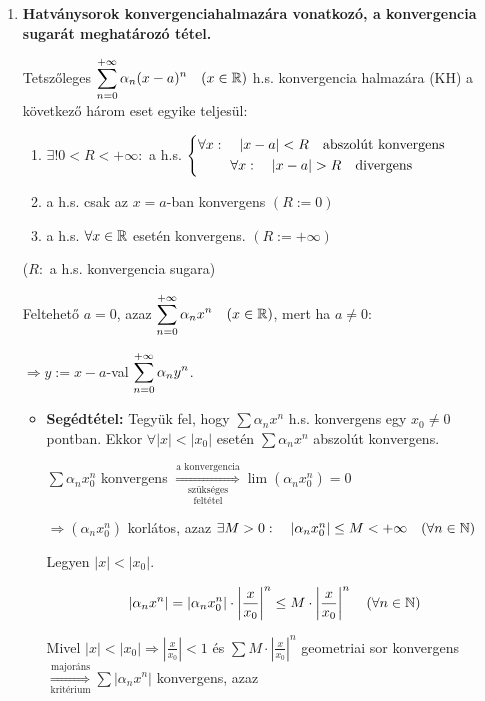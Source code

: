 \documentclass[a4paper,11.5pt]{article}
\begin{document}
\begin{enumerate}
		\item \textbf{Hatványsorok konvergenciahalmazára vonatkozó, a konvergencia sugarát meghatározó tétel.}
		
		Tetszőleges $\displaystyle\sum_{n=0}^{+\infty} \alpha_n(x-a)^n \quad (x\in\mathbb{R})$ h.s. konvergencia halmazára (KH) a következő három eset egyike teljesül:
		\begin{enumerate}
			\item $\exists! 0<R<+\infty: $ \quad a h.s. $\left\{\begin{gathered}
			\forall x:\quad |x-a|<R\text{\quad abszolút konvergens}\\
			\forall x:\quad |x-a|>R\text{\quad divergens}
			\end{gathered}\right.$
			\item a h.s. csak az $x=a$-ban konvergens $(R:=0)$
			\item a h.s. $\forall x \in \mathbb{R}$ esetén konvergens. $(R:=+\infty)$
		\end{enumerate}
		($R: $ a h.s. konvergencia sugara)
		
		\biz Feltehető $a=0$, azaz $\displaystyle\sum_{n=0}^{+\infty} \alpha_nx^n \quad (x\in\mathbb{R})$, mert ha $a\not=0:$
		
		$ \Rightarrow y:=x-a$-val \quad $\displaystyle\sum_{n=0}^{+\infty} \alpha_ny^n$.
		
		\begin{itemize}[~~~~~~~~~]
			\item \textbf{Segédtétel:} Tegyük fel, hogy $\sum\alpha_nx^n$ h.s. konvergens egy $x_0\not=0$ pontban. Ekkor $\forall |x|<|x_0|$ esetén $\sum\alpha_nx^n$ abszolút konvergens.
			
			\biz $\sum\alpha_nx_0^n$ konvergens $\overset{\text{a konvergencia}}{\underset{\text{feltétel}}{\underset{\text{szükséges}}{\Longrightarrow}}}\lim(\alpha_nx^n_0)=0$ 
			
			$\Rightarrow(\alpha_nx^n_0)$ korlátos, azaz $\exists M>0:\quad |\alpha_nx^n_0|\leq M<+\infty \quad (\forall n\in\mathbb{N})$
			
			Legyen $|x|<|x_0|$.
			
			\[ \left|\alpha_nx^n\right|=\left|\alpha_nx^n_0\right|\cdot\left|\frac{x}{x_0}\right|^n\leq M\cdot\left|\frac{x}{x_0}\right|^n \quad (\forall n \in \mathbb{N}) \]
			
			Mivel $|x|<|x_0|\Rightarrow\left|\displaystyle\frac{x}{x_0}\right|<1$ és $\displaystyle\sum M\cdot \left|\frac{x}{x_0}\right|^n$ geometriai sor konvergens $\overset{\text{majoráns}}{\underset{\text{kritérium}}{\Longrightarrow}}\displaystyle\sum|\alpha_nx^n|$ konvergens, azaz 
			

\end{itemize}
\end{enumerate}
\end{document}
